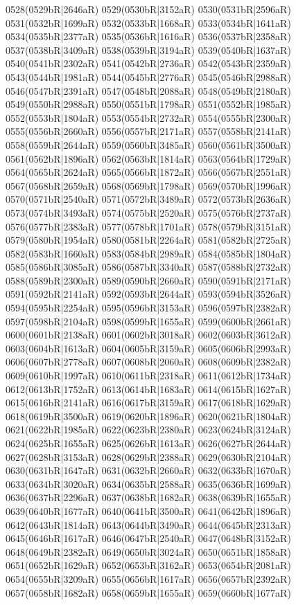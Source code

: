 0528(0529bR|2646aR) 0529(0530bR|3152aR) 0530(0531bR|2596aR) \\0531(0532bR|1699aR) 0532(0533bR|1668aR) 0533(0534bR|1641aR) 0534(0535bR|2377aR) 0535(0536bR|1616aR) 0536(0537bR|2358aR) 0537(0538bR|3409aR) 0538(0539bR|3194aR) 0539(0540bR|1637aR) \\0540(0541bR|2302aR) 0541(0542bR|2736aR) 0542(0543bR|2359aR) 0543(0544bR|1981aR) 0544(0545bR|2776aR) 0545(0546bR|2988aR) 0546(0547bR|2391aR) 0547(0548bR|2088aR) 0548(0549bR|2180aR) \\0549(0550bR|2988aR) 0550(0551bR|1798aR) 0551(0552bR|1985aR) 0552(0553bR|1804aR) 0553(0554bR|2732aR) 0554(0555bR|2300aR) 0555(0556bR|2660aR) 0556(0557bR|2171aR) 0557(0558bR|2141aR) \\0558(0559bR|2644aR) 0559(0560bR|3485aR) 0560(0561bR|3500aR) 0561(0562bR|1896aR) 0562(0563bR|1814aR) 0563(0564bR|1729aR) 0564(0565bR|2624aR) 0565(0566bR|1872aR) 0566(0567bR|2551aR) \\0567(0568bR|2659aR) 0568(0569bR|1798aR) 0569(0570bR|1996aR) 0570(0571bR|2540aR) 0571(0572bR|3489aR) 0572(0573bR|2636aR) 0573(0574bR|3493aR) 0574(0575bR|2520aR) 0575(0576bR|2737aR) \\0576(0577bR|2383aR) 0577(0578bR|1701aR) 0578(0579bR|3151aR) 0579(0580bR|1954aR) 0580(0581bR|2264aR) 0581(0582bR|2725aR) 0582(0583bR|1660aR) 0583(0584bR|2989aR) 0584(0585bR|1804aR) \\0585(0586bR|3085aR) 0586(0587bR|3340aR) 0587(0588bR|2732aR) 0588(0589bR|2300aR) 0589(0590bR|2660aR) 0590(0591bR|2171aR) 0591(0592bR|2141aR) 0592(0593bR|2644aR) 0593(0594bR|3526aR) \\0594(0595bR|2254aR) 0595(0596bR|3153aR) 0596(0597bR|2382aR) 0597(0598bR|2104aR) 0598(0599bR|1655aR) 0599(0600bR|2661aR) 0600(0601bR|2138aR) 0601(0602bR|3018aR) 0602(0603bR|3612aR) \\0603(0604bR|1613aR) 0604(0605bR|3159aR) 0605(0606bR|2993aR) 0606(0607bR|2778aR) 0607(0608bR|2060aR) 0608(0609bR|2382aR) 0609(0610bR|1997aR) 0610(0611bR|2318aR) 0611(0612bR|1734aR) \\0612(0613bR|1752aR) 0613(0614bR|1683aR) 0614(0615bR|1627aR) 0615(0616bR|2141aR) 0616(0617bR|3159aR) 0617(0618bR|1629aR) 0618(0619bR|3500aR) 0619(0620bR|1896aR) 0620(0621bR|1804aR) \\0621(0622bR|1985aR) 0622(0623bR|2380aR) 0623(0624bR|3124aR) 0624(0625bR|1655aR) 0625(0626bR|1613aR) 0626(0627bR|2644aR) 0627(0628bR|3153aR) 0628(0629bR|2388aR) 0629(0630bR|2104aR) \\0630(0631bR|1647aR) 0631(0632bR|2660aR) 0632(0633bR|1670aR) 0633(0634bR|3020aR) 0634(0635bR|2588aR) 0635(0636bR|1699aR) 0636(0637bR|2296aR) 0637(0638bR|1682aR) 0638(0639bR|1655aR) \\0639(0640bR|1677aR) 0640(0641bR|3500aR) 0641(0642bR|1896aR) 0642(0643bR|1814aR) 0643(0644bR|3490aR) 0644(0645bR|2313aR) 0645(0646bR|1617aR) 0646(0647bR|2540aR) 0647(0648bR|3152aR) \\0648(0649bR|2382aR) 0649(0650bR|3024aR) 0650(0651bR|1858aR) 0651(0652bR|1629aR) 0652(0653bR|3162aR) 0653(0654bR|2081aR) 0654(0655bR|3209aR) 0655(0656bR|1617aR) 0656(0657bR|2392aR) \\0657(0658bR|1682aR) 0658(0659bR|1655aR) 0659(0660bR|1677aR) 